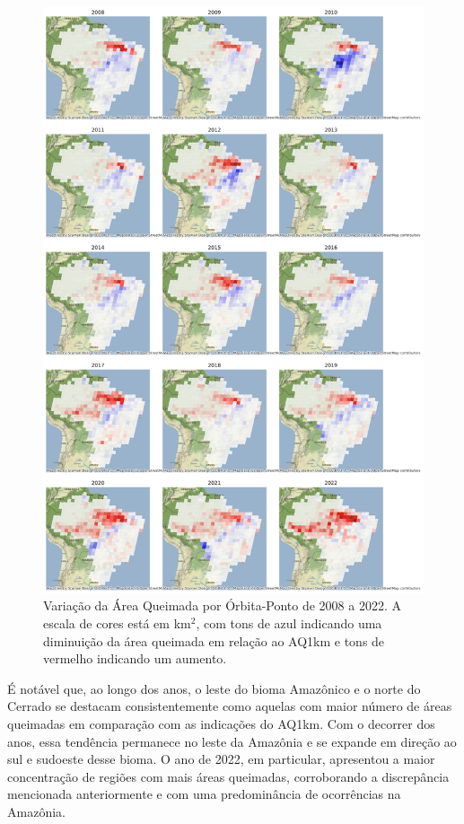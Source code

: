 \documentclass[cic,tc]{iiufrgs}
\begin{document}
\begin{figure}[!htb]
    \caption{Variação da Área Queimada por Órbita-Ponto de 2008 a 2022. A escala de cores está em km$^2$, com tons de azul indicando uma diminuição da área queimada em relação ao AQ1km e tons de vermelho indicando um aumento.}
    \begin{center}
        \includegraphics[width=32em]{diff_year_compare_aqfa-aq1km_path-row}
    \end{center}
    \label{fig:results_teritorio_por_ano}
\end{figure}

É notável que, ao longo dos anos, o leste do bioma Amazônico e o norte do Cerrado se destacam consistentemente como aquelas com maior número de áreas queimadas em comparação com as indicações do AQ1km. Com o decorrer dos anos, essa tendência permanece no leste da Amazônia e se expande em direção ao sul e sudoeste desse bioma. O ano de 2022, em particular, apresentou a maior concentração de regiões com mais áreas queimadas, corroborando a discrepância mencionada anteriormente e com uma predominância de ocorrências na Amazônia. 
\end{document}
